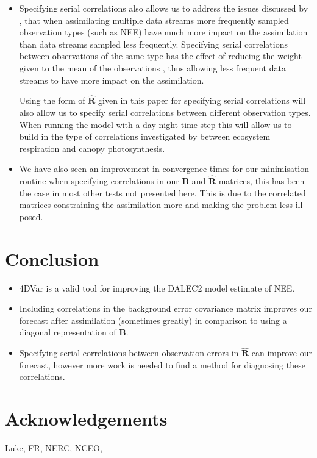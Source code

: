 \documentclass[11pt]{article}
\begin{document}
\begin{itemize}
\item Specifying serial correlations also allows us to address the issues discussed by \citet{richardson2010estimating}, that when assimilating multiple data streams more frequently sampled observation types (such as NEE) have much more impact on the assimilation than data streams sampled less frequently. Specifying serial correlations between observations of the same type has the effect of reducing the weight given to the mean of the observations \citep{jarvinen1999variational}, thus allowing less frequent data streams to have more impact on the assimilation. 

Using the form of $\hat{\mathbf{R}}$ given in this paper for specifying serial correlations will also allow us to specify serial correlations between different observation types. When running the model with a day-night time step this will allow us to build in the type of correlations investigated by \citet{Baldocchi2015} between ecosystem respiration and canopy photosynthesis.

\item We have also seen an improvement in convergence times for our minimisation routine when specifying correlations in our $\textbf{B}$ and $\hat{\mathbf{R}}$ matrices, this has been the case in most other tests not presented here. This is due to the correlated matrices constraining the assimilation more and making the problem less ill-posed.
\end{itemize} 

\section{Conclusion}

\begin{itemize}
\item 4DVar is a valid tool for improving the DALEC2 model estimate of NEE.
\item Including correlations in the background error covariance matrix improves our forecast after assimilation (sometimes greatly) in comparison to using a diagonal representation of $\textbf{B}$.
\item Specifying serial correlations between observation errors in $\hat{\textbf{R}}$ can improve our forecast, however more work is needed to find a method for diagnosing these correlations.
\end{itemize}

\section{Acknowledgements}
Luke, FR, NERC, NCEO, 
\end{document}

